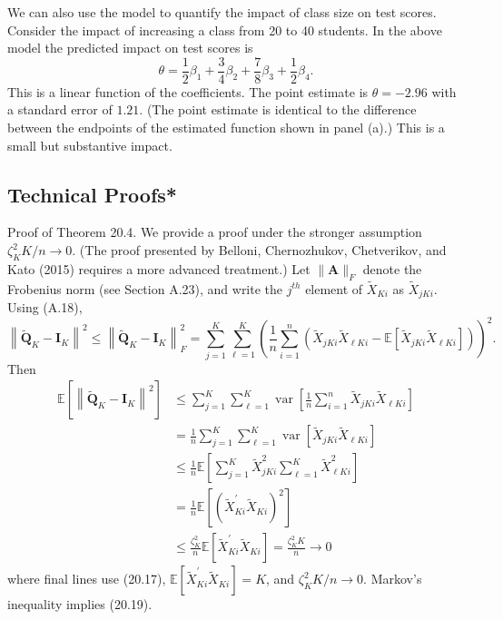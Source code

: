 \documentclass[10pt]{article}
\begin{document}
We can also use the model to quantify the impact of class size on test scores. Consider the impact of increasing a class from 20 to 40 students. In the above model the predicted impact on test scores is
$$
\theta=\frac{1}{2} \beta_{1}+\frac{3}{4} \beta_{2}+\frac{7}{8} \beta_{3}+\frac{1}{2} \beta_{4} .
$$
This is a linear function of the coefficients. The point estimate is $\widehat{\theta}=-2.96$ with a standard error of $1.21$. (The point estimate is identical to the difference between the endpoints of the estimated function shown in panel (a).) This is a small but substantive impact.

\subsection{Technical Proofs*}
Proof of Theorem 20.4. We provide a proof under the stronger assumption $\zeta_{K}^{2} K / n \rightarrow 0$. (The proof presented by Belloni, Chernozhukov, Chetverikov, and Kato (2015) requires a more advanced treatment.) Let $\|\boldsymbol{A}\|_{F}$ denote the Frobenius norm (see Section A.23), and write the $j^{t h}$ element of $\widetilde{X}_{K i}$ as $\widetilde{X}_{j K i}$. Using (A.18),
$$
\left\|\widetilde{\boldsymbol{Q}}_{K}-\boldsymbol{I}_{K}\right\|^{2} \leq\left\|\widetilde{\boldsymbol{Q}}_{K}-\boldsymbol{I}_{K}\right\|_{F}^{2}=\sum_{j=1}^{K} \sum_{\ell=1}^{K}\left(\frac{1}{n} \sum_{i=1}^{n}\left(\widetilde{X}_{j K i} \widetilde{X}_{\ell K i}-\mathbb{E}\left[\widetilde{X}_{j K i} \widetilde{X}_{\ell K i}\right]\right)\right)^{2} .
$$
Then
$$
\begin{aligned}
\mathbb{E}\left[\left\|\widetilde{\boldsymbol{Q}}_{K}-\boldsymbol{I}_{K}\right\|^{2}\right] & \leq \sum_{j=1}^{K} \sum_{\ell=1}^{K} \operatorname{var}\left[\frac{1}{n} \sum_{i=1}^{n} \widetilde{X}_{j K i} \widetilde{X}_{\ell K i}\right] \\
&=\frac{1}{n} \sum_{j=1}^{K} \sum_{\ell=1}^{K} \operatorname{var}\left[\widetilde{X}_{j K i} \widetilde{X}_{\ell K i}\right] \\
& \leq \frac{1}{n} \mathbb{E}\left[\sum_{j=1}^{K} \widetilde{X}_{j K i}^{2} \sum_{\ell=1}^{K} \widetilde{X}_{\ell K i}^{2}\right] \\
&=\frac{1}{n} \mathbb{E}\left[\left(\widetilde{X}_{K i}^{\prime} \widetilde{X}_{K i}\right)^{2}\right] \\
& \leq \frac{\zeta_{K}^{2}}{n} \mathbb{E}\left[\widetilde{X}_{K i}^{\prime} \widetilde{X}_{K i}\right]=\frac{\zeta_{K}^{2} K}{n} \rightarrow 0
\end{aligned}
$$
where final lines use (20.17), $\mathbb{E}\left[\widetilde{X}_{K i}^{\prime} \widetilde{X}_{K i}\right]=K$, and $\zeta_{K}^{2} K / n \rightarrow 0$. Markov's inequality implies (20.19).
\end{document}
